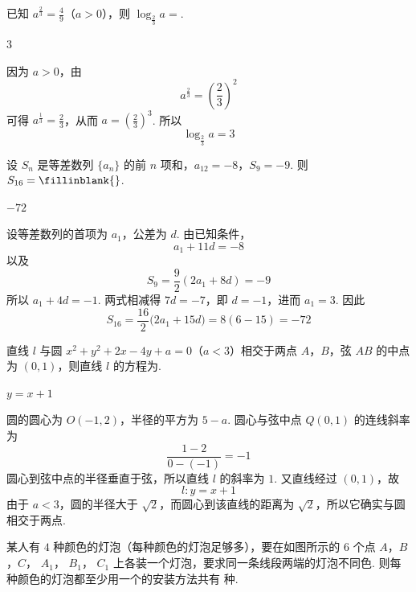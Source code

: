 \begin{problem}
已知 \( a^{\frac{2}{3}} = \frac{4}{9}\)（\(a > 0\)），则 \( \log_{\frac{2}{3}} a = \)\fillinblank{}.
\end{problem}

\begin{answer}
3
\end{answer}

\begin{solution}
因为 \(a>0\)，由
\[
a^{\frac{2}{3}}=\left(\frac{2}{3}\right)^{2}
\]
可得 \(a^{\frac{1}{3}}=\frac{2}{3}\)，从而 \(a=\left(\frac{2}{3}\right)^{3}\). 所以
\[
\log_{\frac{2}{3}}a=3
\]
\end{solution}

\begin{problem}
设 \(S_{n}\) 是等差数列 \(\{a_{n}\}\) 的前 \(n\) 项和，\(a_{12} = -8\)，\(S_{9} = -9\). 则 \(S_{16} =\fillinblank{}\).
\end{problem}

\begin{answer}
\(-72\)
\end{answer}

\begin{solution}
设等差数列的首项为 \(a_{1}\)，公差为 \(d\). 由已知条件，
\[
a_{1}+11d=-8
\]
以及
\[
S_{9}=\frac{9}{2}(2a_{1}+8d)=-9
\]
所以 \(a_{1}+4d=-1\). 两式相减得 \(7d=-7\)，即 \(d=-1\)，进而 \(a_{1}=3\). 因此
\[
S_{16}=\frac{16}{2}\bigl(2a_{1}+15d\bigr)=8(6-15)=-72
\]
\end{solution}

\begin{problem}
直线 \(l\) 与圆 \(x^{2} + y^{2} + 2x - 4y + a = 0\)（\(a < 3\)）相交于两点 \(A\)，\(B\)，弦 \(AB\) 的中点为 \((0, 1)\)，则直线 \(l\) 的方程为\fillinblank{}.
\end{problem}

\begin{answer}
\(y=x+1\)
\end{answer}

\begin{solution}
圆的圆心为 \(O(-1,2)\)，半径的平方为 \(5-a\). 圆心与弦中点 \(Q(0,1)\) 的连线斜率为
\[
\frac{1-2}{0-(-1)}=-1
\]
圆心到弦中点的半径垂直于弦，所以直线 \(l\) 的斜率为 \(1\). 又直线经过 \((0,1)\)，故
\[
l:y=x+1
\]
由于 \(a<3\)，圆的半径大于 \(\sqrt{2}\)，而圆心到该直线的距离为 \(\sqrt{2}\)，所以它确实与圆相交于两点.
\end{solution}

\begin{problem}
某人有 \(4\) 种颜色的灯泡（每种颜色的灯泡足够多），要在如图所示的 \(6\) 个点 \(A\)，\(B\)，\(C\)， \(A_{1}\)， \(B_{1}\)， \(C_{1}\) 上各装一个灯泡，要求同一条线段两端的灯泡不同色. 则每种颜色的灯泡都至少用一个的安装方法共有\fillinblank{} 种.

\FloatBarrier

\end{problem}

